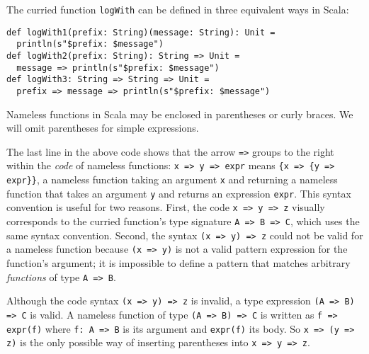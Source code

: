 The curried function \lstinline!logWith!
can be defined in three equivalent ways in Scala:
\begin{lstlisting}
def logWith1(prefix: String)(message: String): Unit =
  println(s"$prefix: $message")
def logWith2(prefix: String): String => Unit =
  message => println(s"$prefix: $message")
def logWith3: String => String => Unit =
  prefix => message => println(s"$prefix: $message")
\end{lstlisting}
Nameless functions in Scala may be enclosed in parentheses or curly
braces. We will omit parentheses for simple expressions.

The last line in the above code shows that the arrow \lstinline!=>!
groups to the right within the \emph{code} of nameless functions:
\lstinline!x => y => expr!
means \lstinline!{x => {y => expr}}!,
a nameless function taking an argument \lstinline!x!
and returning a nameless function that takes an argument \lstinline!y!
and returns an expression \lstinline!expr!.
This syntax convention is useful for two reasons. First, the code
\lstinline!x => y => z!
visually corresponds to the curried function's type signature \lstinline!A => B => C!,
which uses the same syntax convention. Second, the syntax \lstinline!(x => y) => z!
could not be valid for a nameless function because \lstinline!(x => y)!
is not a valid pattern expression for the function's argument; it
is impossible to define a pattern that matches arbitrary \emph{functions}
of type \lstinline!A => B!. 

Although the code syntax \lstinline!(x => y) => z!
is invalid, a type expression \lstinline!(A => B) => C!
is valid. A nameless function of type \lstinline!(A => B) => C!
is written as \lstinline!f => expr(f)!
where \lstinline!f: A => B!
is its argument and \lstinline!expr(f)!
its body. So \lstinline!x => (y => z)!
is the only possible way of inserting parentheses into \lstinline!x => y => z!.


